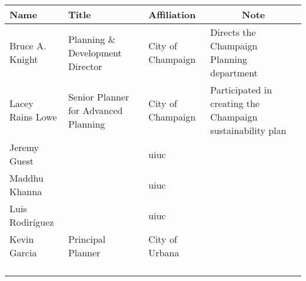 \begin{tabular}[pos]{lllllll}
    Name & Title & Affiliation & \multicolumn{4}{c}{Note} \\
    \toprule
    Bruce A. Knight & Planning \& Development Director & City of Champaign & \multicolumn{4}{l}{Directs the Champaign Planning department}\\
    Lacey Rains Lowe & Senior Planner for Advanced Planning & City of Champaign & \multicolumn{4}{l}{Participated in creating the Champaign sustainability plan}\\
    Jeremy Guest && \ac{uiuc} &&&&\\
    Maddhu Khanna && \ac{uiuc} &&&&\\
    Luis Rodir\'iguez && \ac{uiuc} &&&&\\
    Kevin Garcia & Principal Planner & City of Urbana &&&&\\
    &&&&&&\\
    &&&&&&\\
    &&&&&&\\
    &&&&&&\\
    \bottomrule
\end{tabular}